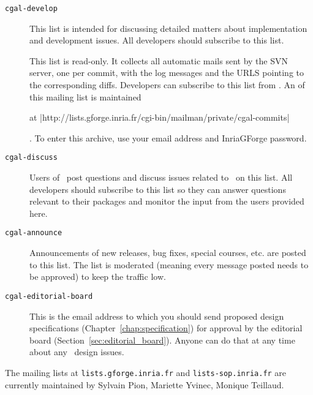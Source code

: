 \begin{description}
\item[{\tt cgal-develop}]
     This list is intended for discussing detailed matters
     about implementation and development issues.  All developers should
     subscribe to this list.

\item[]
     This list is read-only.  It collects all automatic mails sent by
     the SVN server, one per commit, with the log messages and the URLS
     pointing to the corresponding diffs.
     Developers can subscribe to this list from
     .
     An 
     of this mailing list is maintained%
     \begin{ccTexOnly}
     at \nonlinkedpath|http://lists.gforge.inria.fr/cgi-bin/mailman/private/cgal-commits|
     \end{ccTexOnly}.  To enter this archive, use your email address and InriaGForge
     password.

\item[{\tt cgal-discuss}]
     Users of \cgal\ post questions and discuss issues
     related to \cgal\ on this list.  All developers should subscribe to this
     list so they can answer questions relevant to their packages and monitor
     the input from the users provided here.

\item[{\tt cgal-announce}]
     Announcements of new releases, bug fixes, special courses, etc. are posted
     to this list.  The list is moderated (meaning every message posted needs
     to be approved) to keep the traffic low.

\item[{\tt cgal-editorial-board}]
     This is the email address to which you should
     send proposed design specifications (Chapter~\ref{chap:specification})
     for approval by the editorial
     board (Section~\ref{sec:editorial_board}). Anyone can do that
     at any time about any \cgal\ design issues.
\end{description}

The mailing lists at \texttt{lists.gforge.inria.fr} and
\texttt{lists-sop.inria.fr} are currently maintained by
Sylvain Pion, Mariette Yvinec, Monique Teillaud.
